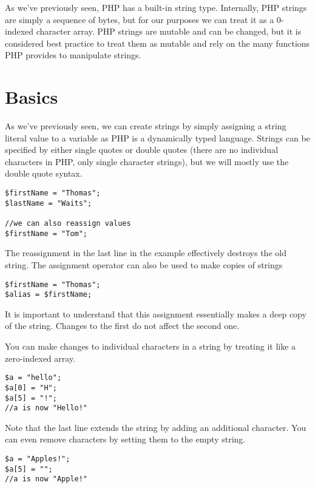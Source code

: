 

As we've previously seen, PHP has a built-in string type.
Internally, PHP strings are simply a sequence of bytes, 
but for our purposes we can treat it as a 0-indexed 
character array.  PHP strings are mutable and can be
changed, but it is considered best practice to treat
them as mutable and rely on the many functions PHP 
provides to manipulate strings.

\section{Basics}

As we've previously seen, we can create strings by
simply assigning a string literal value to a variable
as PHP is a dynamically typed language.  Strings
can be specified by either single quotes or double
quotes (there are no individual characters in PHP, 
only single character strings), but we will mostly
use the double quote syntax.

\begin{verbatim}
$firstName = "Thomas";
$lastName = "Waits";

//we can also reassign values
$firstName = "Tom";
\end{verbatim}

The reassignment in the last line in the example
effectively destroys the old string.  The assignment
operator can also be used to make copies of strings

\begin{verbatim}
$firstName = "Thomas";
$alias = $firstName;
\end{verbatim}

It is important to understand that this assignment 
essentially makes a \gls{deep copy} of the string.
Changes to the first do not affect the second one.

You can make changes to individual characters in a
string by treating it like a zero-indexed array.

\begin{verbatim}
$a = "hello";
$a[0] = "H";
$a[5] = "!";
//a is now "Hello!"
\end{verbatim}

Note that the last line extends the string by adding
an additional character.  You can even remove characters
by setting them to the empty string.

\begin{verbatim}
$a = "Apples!";
$a[5] = "";
//a is now "Apple!"
\end{verbatim}

